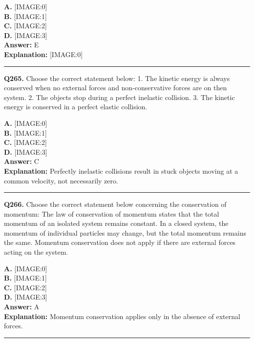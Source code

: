 \documentclass[12pt]{article}
\begin{document}
\textbf{A.} [IMAGE:0] \\
\textbf{B.} [IMAGE:1] \\
\textbf{C.} [IMAGE:2] \\
\textbf{D.} [IMAGE:3] \\

\textbf{Answer:} E \\
\textbf{Explanation:} [IMAGE:0]

\hrule
\vspace{1em}


\noindent
\textbf{Q265.} Choose the correct statement below:
1. The kinetic energy is always conserved when no external forces and non-conservative forces are on then system.
2. The objects stop during a perfect inelastic collision.
3. The kinetic energy is conserved in a perfect elastic collision.



\textbf{A.} [IMAGE:0] \\
\textbf{B.} [IMAGE:1] \\
\textbf{C.} [IMAGE:2] \\
\textbf{D.} [IMAGE:3] \\

\textbf{Answer:} C \\
\textbf{Explanation:} Perfectly inelastic collisions result in stuck objects moving at a common velocity, not necessarily zero.

\hrule
\vspace{1em}


\noindent
\textbf{Q266.} Choose the correct statement below concerning the conservation of momentum:
The law of conservation of momentum states that the total momentum of an isolated system remains constant.
In a closed system, the momentum of individual particles may change, but the total momentum remains the same.
Momentum conservation does not apply if there are external forces acting on the system.



\textbf{A.} [IMAGE:0] \\
\textbf{B.} [IMAGE:1] \\
\textbf{C.} [IMAGE:2] \\
\textbf{D.} [IMAGE:3] \\

\textbf{Answer:} A \\
\textbf{Explanation:} Momentum conservation applies only in the absence of external forces.

\hrule
\vspace{1em}
\end{document}
